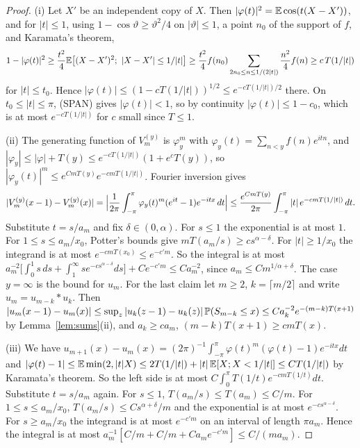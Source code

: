 \begin{proof}
(i) Let $X'$ be an independent copy of $X$. Then $|\varphi(t)|^2=\mathbb{E}\cos(t(X-X'))$, and for
$|t|\le1$, using $1-\cos\vartheta\ge\vartheta^2/4$ on $|\vartheta|\le1$, a point $n_0$ of the support of
$f$, and Karamata's theorem,
\[
 1-|\varphi(t)|^2\ge\frac{t^2}4\E\bigl[(X-X')^2;\ |X-X'|\le1/|t|\bigr]
 \ge\frac{t^2}4f(n_0)\sum_{2n_0\le n\le1/(2|t|)}\frac{n^2}4f(n)\ge c\,T(1/|t|)
\]
for $|t|\le t_0$. Hence $|\varphi(t)|\le(1-cT(1/|t|))^{1/2}\le e^{-cT(1/|t|)/2}$ there. On
$t_0\le|t|\le\pi$, (SPAN) gives $|\varphi(t)|<1$, so by continuity $|\varphi(t)|\le1-c_0$, which is at
most $e^{-cT(1/|t|)}$ for $c$ small since $T\le1$.

(ii) The generating function of $V^{(y)}_m$ is $\varphi_y^m$ with $\varphi_y(t)=\sum_{n<y}f(n)e^{itn}$, and
$|\varphi_y|\le|\varphi|+T(y)\le e^{-cT(1/|t|)}(1+e^cT(y))$, so $|\varphi_y(t)|^m\le e^{CmT(y)}e^{-cmT(1/|t|)}$.
Fourier inversion gives
\[
 |V^{(y)}_m(x-1)-V^{(y)}_m(x)|=\Bigl|\frac1{2\pi}\int_{-\pi}^{\pi}\varphi_y(t)^m(e^{it}-1)e^{-itx}\,dt\Bigr|
 \le\frac{e^{CmT(y)}}{2\pi}\int_{-\pi}^{\pi}|t|\,e^{-cmT(1/|t|)}\,dt .
\]
Substitute $t=s/a_m$ and fix $\delta\in(0,\alpha)$. For $s\le1$ the exponential is at most $1$.
For $1\le s\le a_m/x_0$, Potter's bounds give $mT(a_m/s)\ge cs^{\alpha-\delta}$. For $|t|\ge1/x_0$ the integrand is at most
$e^{-cmT(x_0)}\le e^{-c'm}$. So the integral is at most
$a_m^{-2}\bigl[\int_0^1s\,ds+\int_1^\infty se^{-cs^{\alpha-\delta}}ds\bigr]+Ce^{-c'm}\le Ca_m^{-2}$, since
$a_m\le Cm^{1/\alpha+\delta}$. The case $y=\infty$ is the bound for $u_m$. For the last claim let
$m\ge2$, $k=\lceil m/2\rceil$ and write $u_m=u_{m-k}*u_k$. Then
$|u_m(x-1)-u_m(x)|\le\sup_z|u_k(z-1)-u_k(z)|\,\mathbb{P}(S_{m-k}\le x)\le Ca_k^{-2}e^{-(m-k)T(x+1)}$ by
Lemma~\ref{lem:sums}(ii), and $a_k\ge ca_m$, $(m-k)T(x+1)\ge cmT(x)$.

(iii) We have $u_{m+1}(x)-u_m(x)=(2\pi)^{-1}\int_{-\pi}^\pi\varphi(t)^m(\varphi(t)-1)e^{-itx}dt$ and
$|\varphi(t)-1|\le\mathbb{E}\min(2,|t|X)\le2T(1/|t|)+|t|\,\mathbb{E}[X;X<1/|t|]\le CT(1/|t|)$ by Karamata's theorem. So
the left side is at most $C\int_0^\pi T(1/t)e^{-cmT(1/t)}dt$. Substitute $t=s/a_m$ again. For $s\le1$,
$T(a_m/s)\le T(a_m)\le C/m$. For $1\le s\le a_m/x_0$, $T(a_m/s)\le Cs^{\alpha+\delta}/m$ and the
exponential is at most $e^{-cs^{\alpha-\delta}}$. For $s\ge a_m/x_0$ the integrand is at most
$e^{-c'm}$ on an interval of length $\pi a_m$. Hence the integral is at most
$a_m^{-1}[C/m+C/m+Ca_me^{-c'm}]\le C/(ma_m)$.
\end{proof}

